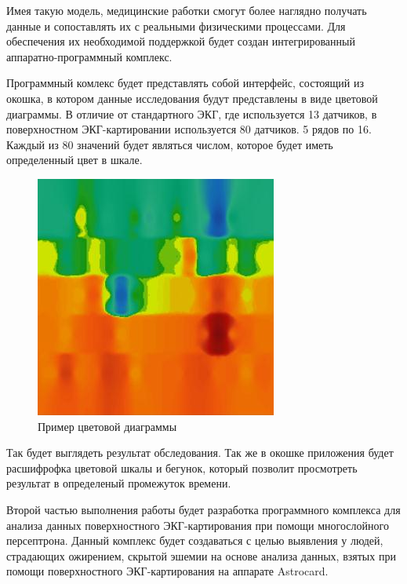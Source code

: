 Имея такую модель, медицинские работки смогут более наглядно
получать данные и сопоставлять их с реальными физическими процессами.
Для обеспечения их необходимой поддержкой будет создан
интегрированный аппаратно-программный комплекс.


Программный комлекс будет представлять собой интерфейс, состоящий из окошка, в котором данные исследования будут представлены 
в виде цветовой диаграммы. В отличие от стандартного ЭКГ, где используется 13 датчиков, в поверхностном ЭКГ-картировании
используется 80 датчиков. 5 рядов по 16. Каждый из 80 значений будет являться числом, которое будет иметь определенный цвет в шкале.
\begin{figure}[ht!]
\begin{center}
\includegraphics[scale=0.85]{ris2}
\end{center}
\caption{Пример цветовой диаграммы}\label{ris2}
\end{figure}

Так будет выглядеть результат обследования. 
Так же в окошке приложения будет расшифрофка цветовой шкалы и бегунок, который позволит просмотреть результат в определеный промежуток времени.



Второй частью выполнения работы будет разработка программного комплекса для анализа данных поверхностного
ЭКГ-картирования при помощи многослойного персептрона. Данный комплекс будет создаваться с целью выявления у людей, страдающих ожирением, скрытой эшемии
на основе анализа данных, взятых при помощи поверхностного ЭКГ-картирования на
аппарате Astrocard. 





